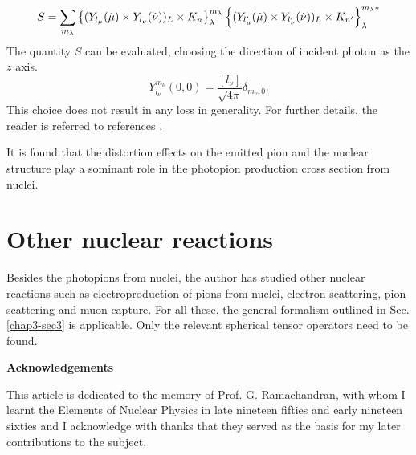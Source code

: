 \begin{equation}
  S= \sum_{m_\lambda} \left\{ (Y_{l_\mu} (\hat{\mu}) \times Y_{l_\nu} (\hat{\nu}))_L \times {\boldmath K}_n\right\}_\lambda^{m_\lambda} \left\{(Y_{l'_\mu} (\hat{\mu}) \times Y_{l_\nu'}(\hat{\nu}))_L \times {\boldmath K}_{n'} \right\}_{\lambda}^{m_\lambda\ast} \label{chap3-eq60}
\end{equation}
The quantity $S$ can be evaluated, choosing the direction of incident photon as the $z$ axis.
$$
Y_{l_\nu}^{m_\nu} (0, 0) = \frac{[l_\nu]}{\sqrt{4\pi}}\delta_{m_\nu, 0}.
$$
This choice does not result in any loss in generality. For further details, the reader is referred to references \cite{key20, key21}.

It is found that the distortion effects on the emitted pion and the nuclear structure play a sominant role \cite{key21} in the photopion production cross section from nuclei.

\section{Other nuclear reactions}\label{chap3-sec6}

Besides the photopions from nuclei, the author has studied other nuclear reactions such as electroproduction of pions from nuclei, electron scattering, pion scattering and muon capture. For all these, the general formalism outlined in Sec.\ref{chap3-sec3} is applicable. Only the relevant spherical tensor operators need to be found.

\medskip
\noindent \textbf{\large Acknowledgements}
\medskip

This article is dedicated to the memory of Prof. G. Ramachandran, with whom I learnt the Elements of Nuclear Physics in late nineteen fifties and early nineteen sixties and I acknowledge with thanks that they served as the basis for my later contributions to the subject.


